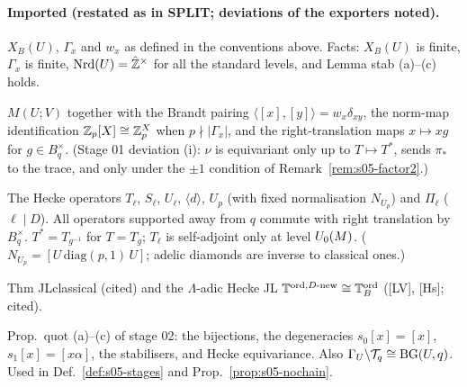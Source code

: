\paragraph{Imported (restated as in SPLIT; deviations of the exporters noted).}
\begin{interface}
$X_B(U)$, $\Gamma_x$ and $w_x$ as defined in the conventions above. Facts: $X_B(U)$ is finite, $\Gamma_x$ is finite,
$\mathrm{Nrd}(U)=\hat{\mathbb{Z}}^\times$ for all the standard levels, and Lemma stab (a)--(c) holds. 
\end{interface}
\begin{interface}
$M(U;V)$ together with the Brandt pairing $\langle[x],[y]\rangle=w_x\delta_{xy}$, the norm-map identification
$\mathbb{Z}_p[X]\cong\mathbb{Z}_p^X$ when $p\nmid|\Gamma_x|$, and the right-translation maps $x\mapsto xg$ for $g\in B_q^\times$.
 (Stage 01 deviation (i): $\nu$ is equivariant only up to $T\mapsto T^*$, sends $\pi_*$ to the
trace, and only under the $\pm1$ condition of Remark~\ref{rem:s05-factor2}.)
\end{interface}
\begin{interface}
The Hecke operators $T_\ell$, $S_\ell$, $U_\ell$, $\langle d\rangle$, $U_p$ (with fixed normalisation $N_{U_p}$) and $\Pi_\ell$
($\ell\mid D$). All operators supported away from $q$ commute with right translation by $B_q^\times$. $T^*=T_{g^{-1}}$ for
$T=T_g$; $T_\ell$ is self-adjoint only at level $U_0(M)$.
 ($N_{U_p}=[U\,\mathrm{diag}(p,1)\,U]$; adelic diamonds are inverse to classical ones.)
\end{interface}
\begin{interface}
Thm JLclassical (cited) and the $\Lambda$-adic Hecke JL $\mathbb{T}^{\mathrm{ord},D\text{-new}}\cong\mathbb{T}^{\mathrm{ord}}_B$ ([LV], [Hs]; cited).
\end{interface}
\begin{interface}
Prop.~quot (a)--(c) of stage 02: the bijections, the degeneracies $s_0[x]=[x]$, $s_1[x]=[x\alpha]$, the stabilisers, and Hecke
equivariance. Also $\Gamma_U\backslash\mathcal{T}_q\cong\mathrm{BG}(U,q)$.  Used in Def.~\ref{def:s05-stages} and
Prop.~\ref{prop:s05-nochain}.
\end{interface}
